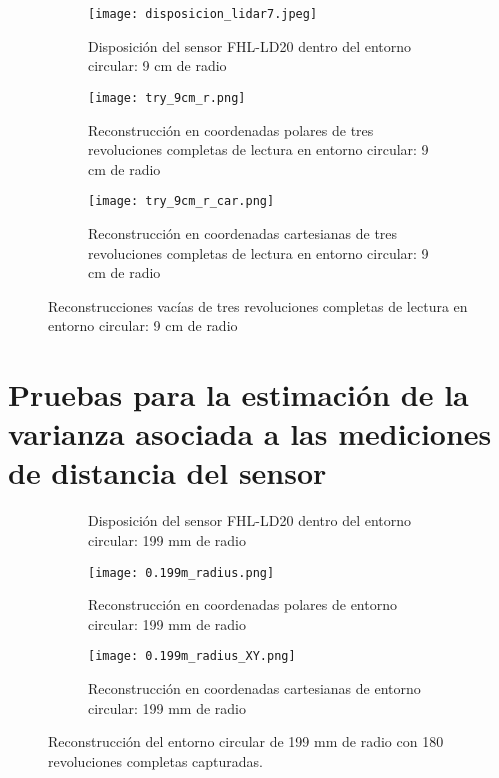 \begin{figure}[H]
	\centering
	\begin{subfigure}{0.6\textwidth}
		\centering
		\texttt{[image: disposicion\_lidar7.jpeg]}
		\caption{Disposición del sensor FHL-LD20 dentro del entorno circular: 9 cm de radio}
		\label{disposicion_lidar6}
		\vspace{1em}
	\end{subfigure}
	\begin{subfigure}{0.45\textwidth}
		\centering
		\texttt{[image: try\_9cm\_r.png]}
		\caption{Reconstrucción en coordenadas polares de tres revoluciones completas de lectura en entorno circular: 9 cm de radio}
		\label{try_9cm_r}
	\end{subfigure}
	\hspace{1em}
	\begin{subfigure}{0.45\textwidth}
		\centering
		\texttt{[image: try\_9cm\_r\_car.png]}
		\caption{Reconstrucción en coordenadas cartesianas de tres revoluciones completas de lectura en entorno circular: 9 cm de radio}
		\label{try_9cm_r_car}
	\end{subfigure}
	\caption{Reconstrucciones vacías de tres revoluciones completas de lectura en entorno circular: 9 cm de radio}
	\label{fig: reconstrucciones_vacías_9}
\end{figure}

\section{Pruebas para la estimación de la varianza asociada a las mediciones de distancia del sensor}
\begin{figure}[H]
	\centering
	\begin{subfigure}{\textwidth}
		\centering
		\caption{Disposición del sensor FHL-LD20 dentro del entorno circular: 199 mm de radio}
		\label{fig:disposicion_lidar_var2}
		\vspace{1em}
	\end{subfigure}
	\begin{subfigure}{0.45\textwidth}
		\centering
		\texttt{[image: 0.199m\_radius.png]}
		\caption{Reconstrucción en coordenadas polares de entorno circular: 199 mm de radio}
		\label{fig:199m_radius_xy}
	\end{subfigure}
	\hspace{1em}
	\begin{subfigure}{0.45\textwidth}
		\centering
		\texttt{[image: 0.199m\_radius\_XY.png]}
		\caption{Reconstrucción en coordenadas cartesianas de entorno circular: 199 mm de radio}
		\label{fig:199m_radius}
	\end{subfigure}
	\caption{Reconstrucción del entorno circular de 199 mm de radio con 180 revoluciones completas capturadas.}
	\label{fig:disposicion_lidar_var_dist2}
\end{figure}


